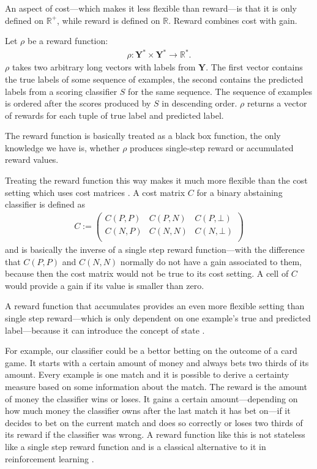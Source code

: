 \documentclass[twoside,11pt]{article}
\def\Y{\textbf{Y}}
\begin{document}
An aspect of cost---which makes it less flexible than
reward---is that it is only defined on $\mathbb{R}^+$,
while reward is defined on $\mathbb{R}$.
Reward combines cost with gain.

Let $\rho$ be a reward function:
\begin{align*}
  \rho: \Y^* \times \Y^* \rightarrow \mathbb{R}^*.
\end{align*}
$\rho$ takes two arbitrary long vectors with labels from
$\Y$.
The first vector contains the true labels of some sequence
of examples, the second contains the predicted labels from
a scoring classifier $S$ for the same sequence.
The sequence of examples is ordered after the scores
produced by $S$ in descending order.
$\rho$ returns a vector of rewards for each tuple of true
label and predicted label.

The reward function is basically treated as a black box
function, the only knowledge we have is, whether $\rho$
produces single-step reward or accumulated reward values.

Treating the reward function this way makes it much more
flexible than the cost setting which uses cost matrices
\citep[see][]{fisher_et_al_2016}. A cost matrix $C$ for a
binary abstaining classifier is defined as
\begin{align*}
  C :=
    \begin{pmatrix}
      C(P, P) &C(P, N) &C(P, \bot) \\
      C(N, P) &C(N, N) &C(N, \bot) \\
    \end{pmatrix}
\end{align*}
and is basically the inverse of a single step reward
function---with the difference that $C(P, P)$ and $C(N, N)$
normally do not have a gain associated to them, because
then the cost matrix would not be true to its cost
setting. A cell of $C$ would provide a gain if its value
is smaller than zero.

A reward function that accumulates provides an even more
flexible setting than single step reward---which is only
dependent on one example's true and predicted
label---because it can introduce the concept of state
\citep[see][Chapter 1]{sutton_et_al_2018}.

For example, our classifier could be a bettor betting on
the outcome of a card game.
It starts with a certain amount of money and always bets
two thirds of its amount.
Every example is one match and it is possible to derive a
certainty measure based on some information about the
match.
The reward is the amount of money the classifier wins or
loses.
It gains a certain amount---depending on how much money the
classifier owns after the last match it has bet on---if
it decides to bet on the current match and does so
correctly or loses two thirds of its reward if the
classifier was wrong.
A reward function like this is not stateless like a
single step reward function and is a classical alternative
to it in reinforcement learning
\citep[see][Chapter 1]{sutton_et_al_2018}.
\end{document}
